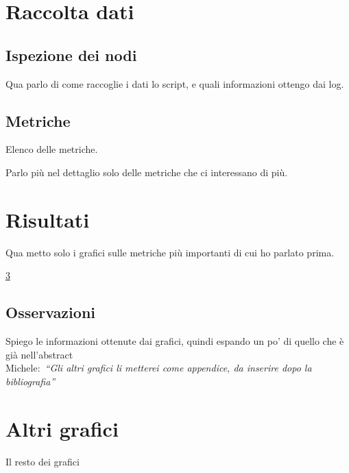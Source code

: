 \documentclass[12pt, a4paper]{article}
\newcommand{\michele}[1]{{\color{red}Michele:~}{\itshape``{#1}''}}
\begin{document}
\section{Raccolta dati}

\subsection{Ispezione dei nodi}

Qua parlo di come raccoglie i dati lo script, e quali informazioni ottengo dai log.

\subsection{Metriche}

Elenco delle metriche.

Parlo più nel dettaglio solo delle metriche che ci interessano di più.

\section{Risultati}

Qua metto solo i grafici sulle metriche più importanti di cui ho parlato prima.

\ref{appendix:grafici}

\subsection{Osservazioni}

Spiego le informazioni ottenute dai grafici, quindi espando un po' di quello che è già nell'abstract \\

\michele{Gli altri grafici li metterei come appendice, da inserire dopo la bibliografia}






\appendix

\section{Altri grafici}\label{appendix:grafici}

Il resto dei grafici
\end{document}
